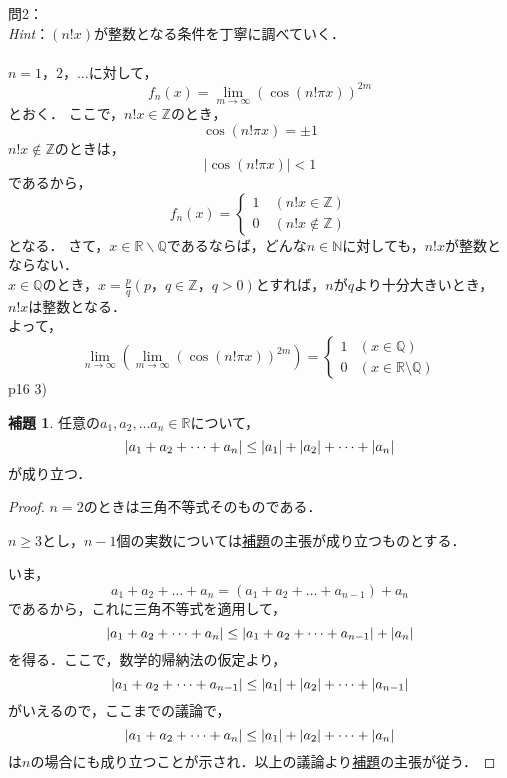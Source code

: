 \documentclass[dvipdfmx,uplatex,11pt]{jsarticle}
\DeclarePairedDelimiter\abs{\lvert}{\rvert}
\theoremstyle{definition}
\newtheorem{lemm}{補題}[section]
\begin{document}
\newpage
\noindent
問2：
\\
\textsl{Hint}：$(n!x)$が整数となる条件を丁寧に調べていく．\\
\dotfill
%
% 
%
\\
$n=1，2，\ldots$に対して，
\[
	f_{n} (x)=\lim_{m \to \infty} (\cos (n! \pi x)) ^{2m}
\]
とおく．
ここで，$n!x \in \mathbb{Z}$のとき，
\[
	\cos (n! \pi x)=\pm 1
\]
$n!x \notin \mathbb{Z}$のときは，
\[
	|\cos (n! \pi x)|<1
\]
であるから，
\[
	f_{n} (x)=
	\begin{cases}
		1 \quad(n!x \in \mathbb{Z}) \\
		0 \quad (n!x \notin \mathbb{Z})
	\end{cases}
\]
となる．
さて，$x \in \mathbb{R} \backslash\mathbb{Q}$であるならば，どんな$n \in \mathbb{N}$に対しても，$n! x$が整数とならない．\\
$x \in \mathbb{Q}$のとき，$ x=\frac{p}{q}(p，q \in \mathbb{Z}，q>0)$とすれば，$n$が$q$より十分大きいとき，$n!x$は整数となる．\\
よって，
\[
	\lim_{n \to \infty} \left( \lim_{m \to \infty} (\cos (n! \pi x)) ^{2m} \right)=
	\begin{cases}
		1 &(x \in \mathbb{Q}) \\
		0 & (x \in \mathbb{R} \setminus \mathbb{Q})
	\end{cases}
\]
%
\newpage
%
p16 3)
\begin{lemm}
    \label{lem:三角不等式の拡張}
    任意の$a_1 , a_2 , \dots a_n \in \mathbb{R}$について，
    \[
        \abs{a_1+a_2+\dots+a_n} \le \abs{a_1}+\abs{a_2}+\dots+\abs{a_n}
    \]
    が成り立つ．
\end{lemm}

\begin{proof}
    $n=2$のときは三角不等式そのものである．
    
    $n \ge 3$とし，$n-1$個の実数については\hyperref[lem:三角不等式の拡張]{補題}の主張が成り立つものとする．

    いま，
    \[
        a_1 + a_2 + \dots + a_n = (a_1+a_2+\dots+a_{n-1})+a_n
    \]
    であるから，これに三角不等式を適用して，
    \[
        \abs{a_1+a_2+\dots+a_n} \le \abs{a_1+a_2+\dots+a_{n-1}} +\abs{a_n}
    \]
    を得る．ここで，数学的帰納法の仮定より，
    \[
        \abs{a_1+a_2+\dots+a_{n-1}} \le \abs{a_1}+\abs{a_2}+\dots+\abs{a_{n-1}}
    \]
    がいえるので，ここまでの議論で，
    \[
        \abs{a_1+a_2+\dots+a_n} \le \abs{a_1}+\abs{a_2}+\dots+\abs{a_n}
    \]
    は$n$の場合にも成り立つことが示され．以上の議論より\hyperref[lem:三角不等式の拡張]{補題}の主張が従う．
\end{proof}
\end{document}
